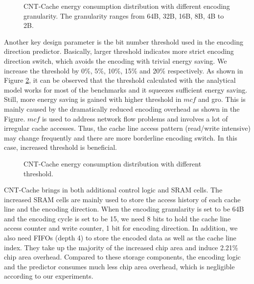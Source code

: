 \begin{figure}
    \caption{CNT-Cache energy consumption distribution with different encoding granularity. 
    The granularity ranges from 64B, 32B, 16B, 8B, 4B to 2B.}
\label{fig:encoding-granularity}
\vspace{-1em}
\end{figure}

Another key design parameter is the bit number threshold used in the 
encoding direction predictor. Basically, larger threshold indicates 
more strict encoding direction switch, which avoids the encoding with 
trivial energy saving. We increase the threshold by 0\%, 5\%, 10\%, 
15\% and 20\% respectively. As shown in Figure \ref{fig:threshold-inc}, it can be observed that 
the threshold calculated with the analytical model works for most of 
the benchmarks and it squeezes sufficient energy saving. Still, more 
energy saving is gained with higher threshold in $mcf$ and gro. 
This is mainly caused by the dramatically reduced encoding 
overhead as shown in the Figure. $mcf$ is used to address network flow problems 
and involves a lot of irregular cache accesses. Thus, the cache line access 
pattern (read/write intensive) may change frequently and there are more 
borderline encoding switch. In this case, increased threshold is 
beneficial.

\begin{figure}
    \caption{CNT-Cache energy consumption distribution with different threshold.}
\label{fig:threshold-inc}
\vspace{-1em}
\end{figure}

CNT-Cache brings in both additional control logic and SRAM cells.
The increased SRAM cells are mainly used to store the access history 
of each cache line and the encoding direction. When the encoding granularity is set 
to be 64B and the encoding cycle is set to be 15, we need 8 bits to hold the cache 
line access counter and write counter, 1 bit for encoding direction. In addition, we also 
need FIFOs (depth 4) to store the encoded data as well as the cache line index. They 
take up the majority of the increased chip area and induce 2.21\% chip area overhead.
Compared to these storage components, the encoding logic and the predictor consumes 
much less chip area overhead, which is negligible according to our experiments.
